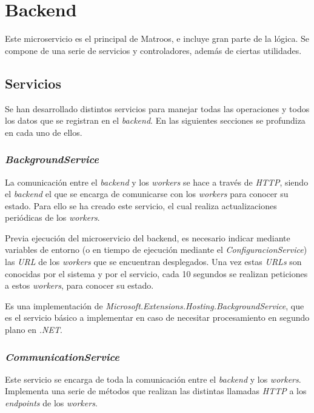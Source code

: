 \section{Backend}

Este microservicio es el principal de Matroos, e incluye gran parte de la lógica. Se compone de una serie de servicios y controladores, además de ciertas utilidades.

\subsection{Servicios}

Se han desarrollado distintos servicios para manejar todas las operaciones y todos los datos que se registran en el \textit{backend}. En las siguientes secciones se profundiza en cada uno de ellos.

\subsubsection{\textit{BackgroundService}}

La comunicación entre el \textit{backend} y los \textit{workers} se hace a través de \textit{HTTP}, siendo el \textit{backend} el que se encarga de comunicarse con los \textit{workers} para conocer su estado. Para ello se ha creado este servicio, el cual realiza actualizaciones periódicas de los \textit{workers}.

Previa ejecución del microservicio del backend, es necesario indicar mediante variables de entorno (o en tiempo de ejecución mediante el \textit{ConfiguracionService}) las \textit{URL} de los \textit{workers} que se encuentran desplegados. Una vez estas \textit{URLs} son conocidas por el sistema y por el servicio, cada 10 segundos se realizan peticiones a estos \textit{workers}, para conocer su estado.

Es una implementación de \textit{Microsoft.Extensions.Hosting.BackgroundService}, que es el servicio básico a implementar en caso de necesitar procesamiento en segundo plano en \textit{.NET}.

\subsubsection{\textit{CommunicationService}}

Este servicio se encarga de toda la comunicación entre el \textit{backend} y los \textit{workers}. Implementa una serie de métodos que realizan las distintas llamadas \textit{HTTP} a los \textit{endpoints} de los \textit{workers}.

